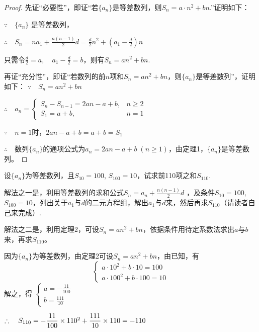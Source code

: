 \begin{proof}
    先证“必要性”，即证“若$\{a_n\}$是等差数列，则$S_n=a\cdot n^2+bn$.”证明如下：

$\because\quad \{a_n\}$ 是等差数列，

$\therefore\quad S_n=na_1+\frac{n(n-1)}{2}d=\frac{d}{2}n^2+\left(a_1-\frac{d}{2}\right)n$

只需令$\frac{d}{2}=a,\quad a_1-\frac{d}{2}=b$，则有$S_n=an^2+bn$.

再证“充分性”，即证“若数列的前$n$项和$S_n=an^2+bn$，则$\{a_n\}$是等差数列”，证明如下：
$\because\quad S_n=an^2+bn$

$\therefore\quad a_n=\begin{cases}
    S_n-S_{n-1}=2an-a+b, & n\ge 2\\
    S_1=a+b, & n=1
\end{cases}$

$\because\quad n=1$时，$2an-a+b=a+b=S_1$

$\therefore\quad $数列$\{a_n\}$的通项公式为$a_n=2an-a+b\; (n\ge 1)$，由定理1，$\{a_n\}$是等差数列。
\end{proof}


\begin{example}
    设$\{a_n\}$为等差数列，且$S_{10}=100$, $S_{100}=10$，试求前110项之和$S_{110}$.
\end{example}

\begin{analyze}
解法之一是，利用等差数列的求和公式$S_n=a_n+\frac{n(n-1)}{2}d$
，及条件$S_{10}=100$, $S_{100}=10$，列出关于$a_1$与$d$的二元方程组，解出$a_1$与$d$来，然后再求$S_{110}$（请读者自己来完成）.

解法之二是，利用定理2，可设$S_n=an^2+bn$，依据条件用待定系数法求出$a$与$b$来，再求$S_{110}$。
\end{analyze}

\begin{solution}
因为$\{a_n\}$为等差数列，由定理2可设$S_n=an^2+bn$，由已知，有
\[\begin{cases}
    a\cdot 10^2+b\cdot 10=100\\
    a\cdot 100^2+b\cdot 100=10
\end{cases}\]
解之，得
$\begin{cases}
    a=-\frac{11}{100}\\[1.5ex]
    b=\frac{111}{10}
\end{cases}$

$\therefore\quad S_{110}=-\dfrac{11}{100}\times 110^2+\dfrac{111}{10}\times 110=-110$
\end{solution}




